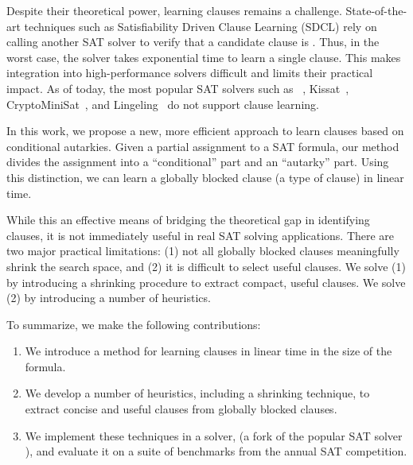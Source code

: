 Despite their theoretical power, learning \pr clauses remains a challenge. State-of-the-art techniques such as Satisfiability Driven Clause Learning (SDCL) rely on calling another SAT solver to verify that a candidate clause is \pr \cite{sadical}. 
Thus, in the worst case, the solver takes exponential time to learn a single \pr clause. This makes integration into high-performance solvers difficult and limits their practical impact. As of today, the most popular SAT solvers such as \cadical~\cite{cadical}, Kissat~\cite{kissat}, CryptoMiniSat~\cite{cryptominisat}, and Lingeling~\cite{lingeling} do not support \pr clause learning.

In this work, we propose a new, more efficient approach to learn \pr clauses based on conditional autarkies. Given a partial assignment to a SAT formula, our method divides the assignment into a ``conditional'' part and an ``autarky'' part. Using this distinction, we can learn a globally blocked clause (a type of \pr clause) in linear time.

While this an effective means of bridging the theoretical gap in identifying \pr clauses, it is not immediately useful in real SAT solving applications. There are two major practical limitations: (1) not all globally blocked clauses meaningfully shrink the search space, and (2) it is difficult to select useful clauses. We solve (1) by introducing a shrinking procedure to extract compact, useful \pr clauses. We solve (2) by introducing a number of heuristics.



To summarize, we make the following contributions: 

\begin{enumerate} 
    \item We introduce a method for learning \pr clauses in linear time in the size of the formula. 
    \item We develop a number of heuristics, including a shrinking technique, to extract concise and useful \pr clauses from globally blocked clauses. 
    \item We implement these techniques in a solver, \tool (a fork of the popular SAT solver \cadical), and evaluate it on a suite of benchmarks from the annual SAT competition.
\end{enumerate}